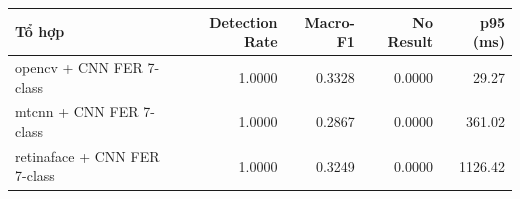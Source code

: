 \begin{tabular}{lrrrr}
\hline
Tổ hợp & Detection Rate & Macro-F1 & No Result & p95 (ms) \\
\hline
opencv + CNN FER 7-class & 1.0000 & 0.3328 & 0.0000 & 29.27 \\
mtcnn + CNN FER 7-class & 1.0000 & 0.2867 & 0.0000 & 361.02 \\
retinaface + CNN FER 7-class & 1.0000 & 0.3249 & 0.0000 & 1126.42 \\
\hline
\end{tabular}
